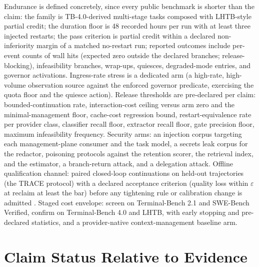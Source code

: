 \documentclass[11pt]{article}
\begin{document}
Endurance is defined concretely, since every public benchmark is shorter than the claim: the family is TB-4.0-derived multi-stage tasks composed with LHTB-style partial credit; the duration floor is 48 recorded hours per run with at least three injected restarts; the pass criterion is partial credit within a declared non-inferiority margin of a matched no-restart run; reported outcomes include per-event counts of wall hits (expected zero outside the declared branches; release-blocking), infeasibility branches, wrap-ups, quiesces, degraded-mode entries, and governor activations. Ingress-rate stress is a dedicated arm (a high-rate, high-volume observation source against the enforced governor predicate, exercising the quota floor and the quiesce action). Release thresholds are pre-declared per claim: bounded-continuation rate, interaction-cost ceiling versus arm zero and the minimal-management floor, cache-cost regression bound, restart-equivalence rate per provider class, classifier recall floor, extractor recall floor, gate precision floor, maximum infeasibility frequency. Security arms: an injection corpus targeting each management-plane consumer and the task model, a secrets leak corpus for the redactor, poisoning protocols against the retention scorer, the retrieval index, and the estimator, a branch-return attack, and a delegation attack. Offline qualification channel: paired closed-loop continuations on held-out trajectories (the TRACE protocol) with a declared acceptance criterion (quality loss within $\varepsilon$ at reclaim at least the bar) before any tightening rule or calibration change is admitted \cite{trace2026}. Staged cost envelope: screen on Terminal-Bench 2.1 and SWE-Bench Verified, confirm on Terminal-Bench 4.0 and LHTB, with early stopping and pre-declared statistics, and a provider-native context-management baseline arm.

\section{Claim Status Relative to Evidence}
\end{document}
